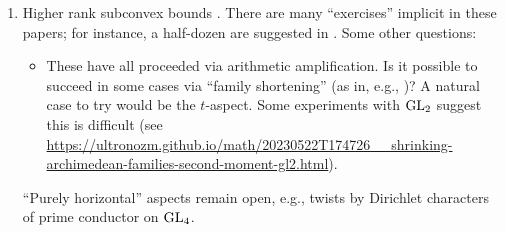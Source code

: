 \documentclass[reqno]{amsart} 
\begin{document}
\begin{enumerate}
\item Higher rank subconvex bounds \cite{MR4203038, 2023arXiv2309.16667, 2020arXiv201202187N, 2021arXiv210915230N, 2023arXiv2309.06314}.  There are many ``exercises'' implicit in these papers; for instance, a half-dozen are suggested in \cite[Remark 1.4]{2020arXiv201202187N}.  Some other questions:
  \begin{itemize}
  \item These have all proceeded via arithmetic amplification.  Is it possible to succeed in some cases via ``family shortening'' (as in, e.g., \cite{Sar01})?  A natural case to try would be the $t$-aspect.  Some experiments with $\operatorname{GL}_2$ suggest this is difficult (see \url{https://ultronozm.github.io/math/20230522T174726__shrinking-archimedean-families-second-moment-gl2.html}).
  \end{itemize} ``Purely horizontal'' aspects remain open, e.g., twists by Dirichlet characters of prime conductor on $\operatorname{GL}_4$.
\end{enumerate}


{} 
\end{document}
